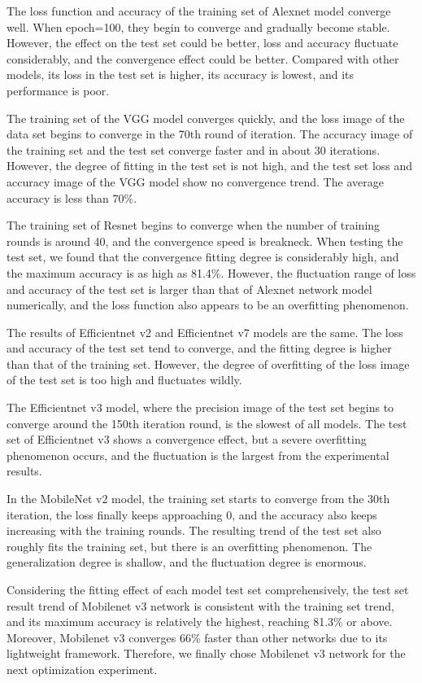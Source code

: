 \documentclass[a4paper,fleqn]{cas-sc}
\begin{document}
The loss function and accuracy of the training set of Alexnet model converge well. When epoch=100, they begin to converge and gradually become stable. However, the effect on the test set could be better, loss and accuracy fluctuate considerably, and the convergence effect could be better. Compared with other models, its loss in the test set is higher, its accuracy is lowest, and its performance is poor. 

The training set of the VGG model converges quickly, and the loss image of the data set begins to converge in the 70th round of iteration. The accuracy image of the training set and the test set converge faster and in about 30 iterations. However, the degree of fitting in the test set is not high, and the test set loss and accuracy image of the VGG model show no convergence trend. The average accuracy is less than 70\%. 

The training set of Resnet begins to converge when the number of training rounds is around 40, and the convergence speed is breakneck. When testing the test set, we found that the convergence fitting degree is considerably high, and the maximum accuracy is as high as 81.4\%. However, the fluctuation range of loss and accuracy of the test set is larger than that of Alexnet network model numerically, and the loss function also appears to be an overfitting phenomenon. 

The results of Efficientnet v2 and Efficientnet v7 models are the same. The loss and accuracy of the test set tend to converge, and the fitting degree is higher than that of the training set. However, the degree of overfitting of the loss image of the test set is too high and fluctuates wildly. 

The Efficientnet v3 model, where the precision image of the test set begins to converge around the 150th iteration round, is the slowest of all models. The test set of Efficientnet v3 shows a convergence effect, but a severe overfitting phenomenon occurs, and the fluctuation is the largest from the experimental results. 

In the MobileNet v2 model, the training set starts to converge from the 30th iteration, the loss finally keeps approaching 0, and the accuracy also keeps increasing with the training rounds. The resulting trend of the test set also roughly fits the training set, but there is an overfitting phenomenon. The generalization degree is shallow, and the fluctuation degree is enormous. 

Considering the fitting effect of each model test set comprehensively, the test set result trend of Mobilenet v3 network is consistent with the training set trend, and its maximum accuracy is relatively the highest, reaching 81.3\% or above. Moreover, Mobilenet v3 converges 66\% faster than other networks due to its lightweight framework. Therefore, we finally chose Mobilenet v3 network for the next optimization experiment.
\end{document}
